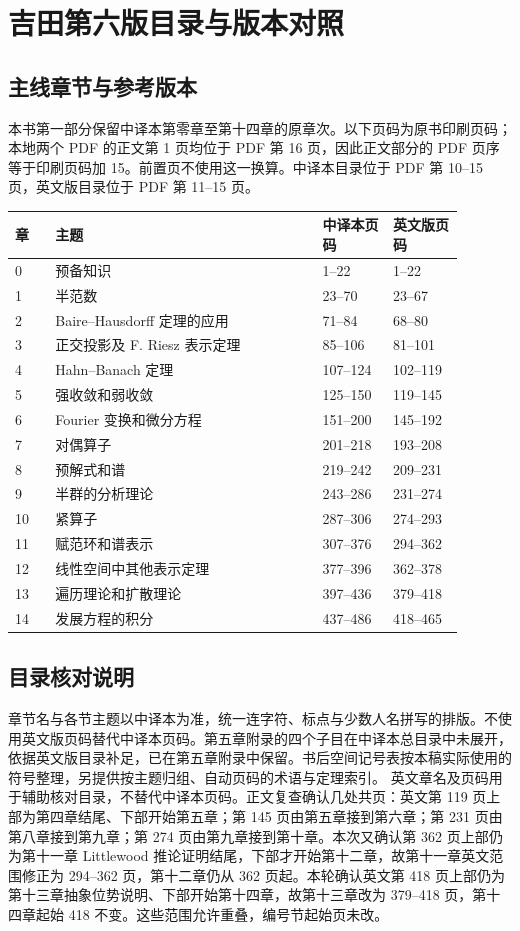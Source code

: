\chapter{吉田第六版目录与版本对照}\label{app:yosida-map}
\section{主线章节与参考版本}
本书第一部分保留中译本第零章至第十四章的原章次。以下页码为原书印刷页码；本地两个 PDF 的正文第 1 页均位于 PDF 第 16 页，因此正文部分的 PDF 页序等于印刷页码加 15。前置页不使用这一换算。中译本目录位于 PDF 第 10--15 页，英文版目录位于 PDF 第 11--15 页。
\begin{center}\small
\begin{tabular}{p{0.08\linewidth}p{0.53\linewidth}p{0.14\linewidth}p{0.14\linewidth}}
\toprule 章 & 主题 & 中译本页码 & 英文版页码\\\midrule
0 & 预备知识 & 1--22 & 1--22 \\
1 & 半范数 & 23--70 & 23--67 \\
2 & Baire--Hausdorff 定理的应用 & 71--84 & 68--80 \\
3 & 正交投影及 F. Riesz 表示定理 & 85--106 & 81--101 \\
4 & Hahn--Banach 定理 & 107--124 & 102--119 \\
5 & 强收敛和弱收敛 & 125--150 & 119--145 \\
6 & Fourier 变换和微分方程 & 151--200 & 145--192 \\
7 & 对偶算子 & 201--218 & 193--208 \\
8 & 预解式和谱 & 219--242 & 209--231 \\
9 & 半群的分析理论 & 243--286 & 231--274 \\
10 & 紧算子 & 287--306 & 274--293 \\
11 & 赋范环和谱表示 & 307--376 & 294--362 \\
12 & 线性空间中其他表示定理 & 377--396 & 362--378 \\
13 & 遍历理论和扩散理论 & 397--436 & 379--418 \\
14 & 发展方程的积分 & 437--486 & 418--465 \\
\bottomrule\end{tabular}\end{center}
\section{目录核对说明}
章节名与各节主题以中译本为准，统一连字符、标点与少数人名拼写的排版。不使用英文版页码替代中译本页码。第五章附录的四个子目在中译本总目录中未展开，依据英文版目录补足，已在第五章附录中保留。书后空间记号表按本稿实际使用的符号整理，另提供按主题归组、自动页码的术语与定理索引。
英文章名及页码用于辅助核对目录，不替代中译本页码。正文复查确认几处共页：英文第 119 页上部为第四章结尾、下部开始第五章；第 145 页由第五章接到第六章；第 231 页由第八章接到第九章；第 274 页由第九章接到第十章。本次又确认第 362 页上部仍为第十一章 Littlewood 推论证明结尾，下部才开始第十二章，故第十一章英文范围修正为 294--362 页，第十二章仍从 362 页起。本轮确认英文第 418 页上部仍为第十三章抽象位势说明、下部开始第十四章，故第十三章改为 379--418 页，第十四章起始 418 不变。这些范围允许重叠，编号节起始页未改。

